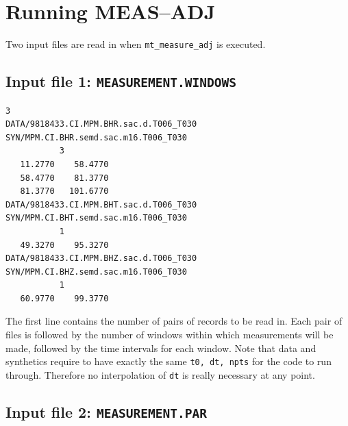 \documentclass[11pt,titlepage,fleqn]{article}
\begin{document}
\pagebreak
\section{Running MEAS--ADJ}

Two input files are read in when \verb+mt_measure_adj+ is executed.


\subsection{Input file 1: {\tt MEASUREMENT.WINDOWS}}

\begin{verbatim}
3
DATA/9818433.CI.MPM.BHR.sac.d.T006_T030
SYN/MPM.CI.BHR.semd.sac.m16.T006_T030
           3
   11.2770    58.4770
   58.4770    81.3770
   81.3770   101.6770
DATA/9818433.CI.MPM.BHT.sac.d.T006_T030
SYN/MPM.CI.BHT.semd.sac.m16.T006_T030
           1
   49.3270    95.3270
DATA/9818433.CI.MPM.BHZ.sac.d.T006_T030
SYN/MPM.CI.BHZ.semd.sac.m16.T006_T030
           1
   60.9770    99.3770
\end{verbatim}
%
The first line contains the number of pairs of records to be read in.  Each pair of files is followed by the number of windows within which measurements will be made, followed by the time intervals for each window.
Note that data and synthetics require to have exactly the same \verb+t0, dt, npts+ for the code to run through. Therefore 
no interpolation of \verb+dt+ is really necessary at any point.


\pagebreak
\subsection{Input file 2: {\tt MEASUREMENT.PAR}}
\end{document}
